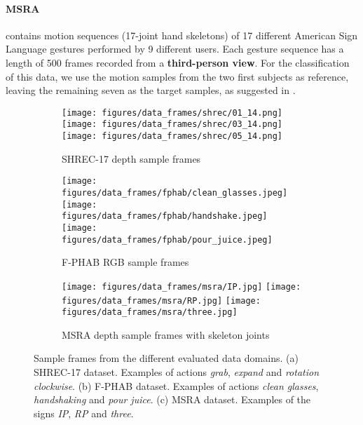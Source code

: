 \documentclass[letterpaper, 10 pt, conference]{ieeeconf}
\begin{document}
\paragraph*{MSRA \cite{sun2015cascaded}} contains motion sequences (17-joint hand skeletons) of 17 different American Sign Language gestures performed by 9 different users. Each gesture sequence has a length of 500 frames recorded from a \textbf{third-person view}.
For the classification of this data, we use the motion samples from the two first subjects as reference, leaving the remaining seven as the target samples, as suggested in \cite{liu20203d}. \\

\begin{figure}[!bt] \label{fig:frame_samples}
\centering


\begin{subfigure}[b]{\linewidth} 
\centering
    \texttt{[image: figures/data\_frames/shrec/01\_14.png]}
    \texttt{[image: figures/data\_frames/shrec/03\_14.png]}
    \texttt{[image: figures/data\_frames/shrec/05\_14.png]}
\caption{SHREC-17 depth sample frames}
\end{subfigure}
\begin{subfigure}[b]{\linewidth} 
\centering
\texttt{[image: figures/data\_frames/fphab/clean\_glasses.jpeg]}
    \texttt{[image: figures/data\_frames/fphab/handshake.jpeg]}
    \texttt{[image: figures/data\_frames/fphab/pour\_juice.jpeg]}
    \caption{F-PHAB RGB sample frames}
\end{subfigure}
\begin{subfigure}[b]{\linewidth} 
\centering
    \texttt{[image: figures/data\_frames/msra/IP.jpg]}
    \texttt{[image: figures/data\_frames/msra/RP.jpg]}
    \texttt{[image: figures/data\_frames/msra/three.jpg]}
    \caption{MSRA depth sample frames with skeleton joints}
\end{subfigure}
    \caption{Sample frames from the different evaluated data domains. (a) SHREC-17 dataset. Examples of actions \textit{grab}, \textit{expand} and \textit{rotation clockwise}. (b) F-PHAB dataset. Examples of actions \textit{clean glasses}, \textit{handshaking} and \textit{pour juice}. (c) MSRA dataset. Examples of the signs \textit{IP}, \textit{RP} and \textit{three}.}
    \label{fig:frame_samples}
\end{figure}
\end{document}

